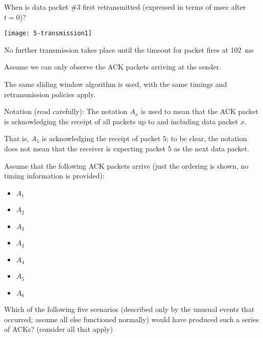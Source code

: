 \documentclass{supervision}
\begin{document}
\begin{questions}
\begin{parts}
\begin{subparts}
              When is data packet \#3 first retransmitted (expressed in terms
              of msec after $t=0$)?
              \begin{solution}
                  \begin{center}
                    \texttt{[image: 5-transmission1]}
                  \end{center}
                  No further transmission takes place until the timeout for
                  packet fires at \SI{102}{ms}
              \end{solution}

            \subpart Assume we can only observe the ACK packets arriving at
              the sender.

              The same sliding window algorithm is used, with the same
              timings and retransmission policies apply.

              Notation (read carefully): The notation $A_x$ is used to mean
              that the ACK packet is acknowledging the receipt of all packets
              up to and including data packet $x$.

              That is, $A_5$ is acknowledging the receipt of packet $5$; to be
              clear, the notation does not mean that the receiver is
              expecting packet $5$ as the next data packet.

              Assume that the following ACK packets arrive (just the ordering
              is shown, no timing information is provided):

              \begin{itemize}
                \item $A_1$
                \item $A_2$
                \item $A_3$
                \item $A_3$
                \item $A_4$
                \item $A_5$
                \item $A_6$
              \end{itemize}

              Which of the following five scenarios (described only by the
              unusual events that occurred; assume all else functioned
              normally) would have produced such a series of ACKs? (consider
              all that apply)


\end{subparts}
\end{parts}
\end{questions}
\end{document}

